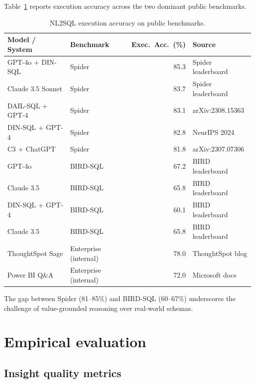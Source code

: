 \documentclass[preprint,12pt,authoryear]{elsarticle}
\theoremstyle{definition}
\begin{document}
Table~\ref{tab:nl2sql-benchmarks} reports execution accuracy across the two dominant public benchmarks.

\begin{table}[ht]
\centering
\caption{NL2SQL execution accuracy on public benchmarks.}
\label{tab:nl2sql-benchmarks}
\begin{tabular}{llrl}
\toprule
\textbf{Model / System} & \textbf{Benchmark} & \textbf{Exec.~Acc.~(\%)} & \textbf{Source} \\
\midrule
GPT-4o + DIN-SQL        & Spider & 85.3 & Spider leaderboard \\
Claude 3.5 Sonnet       & Spider & 83.7 & Spider leaderboard \\
DAIL-SQL + GPT-4        & Spider & 83.1 & arXiv:2308.15363 \\
DIN-SQL + GPT-4         & Spider & 82.8 & NeurIPS 2024 \\
C3 + ChatGPT            & Spider & 81.8 & arXiv:2307.07306 \\
\midrule
GPT-4o                  & BIRD-SQL & 67.2 & BIRD leaderboard \\
Claude 3.5              & BIRD-SQL & 65.8 & BIRD leaderboard \\
DIN-SQL + GPT-4         & BIRD-SQL & 60.1 & BIRD leaderboard \\
Claude 3.5              & BIRD-SQL & 65.8 & BIRD leaderboard \\
\midrule
ThoughtSpot Sage        & Enterprise (internal) & 78.0 & ThoughtSpot blog \\
Power BI Q\&A           & Enterprise (internal) & 72.0 & Microsoft docs \\
\bottomrule
\end{tabular}
\end{table}

The gap between Spider (81--85\%) and BIRD-SQL (60--67\%) underscores the challenge of value-grounded reasoning over real-world schemas.

\section{Empirical evaluation}\label{sec:evaluation}

\subsection{Insight quality metrics}
\end{document}
